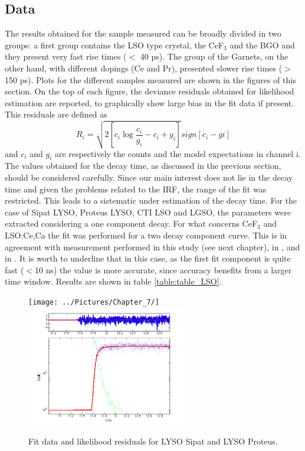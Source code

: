 \subsection{Data}
The results obtained for the sample measured can be broadly divided in two groups: a first group contains the LSO type crystal, the CeF$_{3}$ and the BGO and they present very fast rise times ($<$ 40 ps).
The group of the Garnets, on the other hand, with different dopings (Ce and Pr), presented slower rise times ($>$150 ps).
Plots for the different samples measured are shown in the figures of this section. On the top of each figure, the deviance residuals obtained for likelihood estimation are reported, to graphically show large bias in the fit data if present. This residuals are defined as
\begin{equation}
R_{i} = \sqrt{2\left[ c_{i}\log{\frac{c_{i}}{g_{i}}-c_{i}+g_{i}} \right]}sign\left[ c_{i}-g{i} \right]
\end{equation}
and $c_{i}$ and $g_{i}$ are respectively the counts and the model expectations in channel i.
The values obtained for the decay time, as discussed in the previous section, should be considered carefully. 
Since our main interest does not lie in the decay time and given the problems related to the IRF, the range of the fit was restricted. This leads to a sistematic under estimation of the decay time.
For the case of Sipat LYSO, Proteus LYSO, CTI LSO and LGSO,  the parameters were extracted considering a one component decay. 
For what concerns CeF$_{3}$ and LSO:Ce,Ca the fit was performed for a two decay component curve. This is in agreement with measurement performed in this study (see next chapter), in \cite{Gundacker2014}, and in \cite{ref:Lecoq2006}.
It is worth to underline that in this case, as the first fit component is quite fast ($<$10 ns) the value is more accurate, since accuracy benefits from a larger time window.
Results are shown in table \ref{table:table_LSO}.

\begin{figure}[htbp]
\begin{center}
\texttt{[image: ../Pictures/Chapter\_7/]}
\includegraphics[width=7cm]{../Pictures/Chapter_7/2737_proteus.png}
\end{center}
\caption[LYSO Sipat and Proteus profile]{Fit data and likelihood residuals for LYSO Sipat and LYSO Proteus.}
\label{fig:sipat_proteus}
\end{figure}

